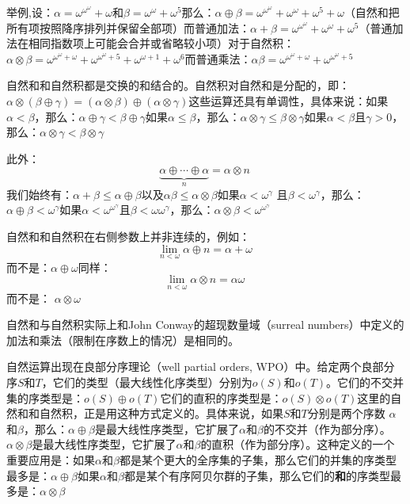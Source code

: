举例,设：\(\alpha = \omega^{\omega^{\omega}} + \omega\)和\(\beta = \omega^{\omega} + \omega^5\)那么：\(\alpha \oplus \beta = \omega^{\omega^{\omega}} + \omega^{\omega} + \omega^5 + \omega\)（自然和把所有项按照降序排列并保留全部项）而普通加法：\(\alpha + \beta = \omega^{\omega^{\omega}} + \omega^{\omega} + \omega^5\)（普通加法在相同指数项上可能会合并或省略较小项）对于自然积：\(\alpha \otimes \beta = \omega^{\omega^{\omega} + \omega} + \omega^{\omega^{\omega} + 5} + \omega^{\omega + 1} + \omega^6\)而普通乘法：\(\alpha\beta = \omega^{\omega^{\omega} + \omega} + \omega^{\omega^{\omega} + 5}\)

自然和和自然积都是交换的和结合的。自然积对自然和是分配的，即：\(\alpha\otimes (\beta \oplus \gamma) = (\alpha \otimes \beta)\oplus(\alpha\otimes \gamma)\)这些运算还具有单调性，具体来说：如果\(\alpha < \beta\)，那么：\(\alpha \oplus \gamma<\beta \oplus \gamma\)如果\(\alpha \leq\beta\)，那么：\(\alpha \otimes \gamma \leq \beta\otimes\gamma\)如果\(\alpha < \beta\)且\(\gamma > 0\)，那么：\(\alpha\otimes\gamma<\beta \otimes \gamma\)

此外：
\[
\underbrace{\alpha \oplus \cdots \oplus \alpha}_{n} = \alpha \otimes n~
\]
我们始终有：\(\alpha + \beta \leq \alpha \oplus \beta\)以及\(\alpha \beta \leq \alpha \otimes \beta\)如果\(\alpha<\omega^\gamma\) 且\(\beta<\omega^\gamma\)，那么：\(\alpha\oplus\beta<\omega^\gamma\)如果\(\alpha < \omega^{\omega^\gamma}\)且\(\beta<\omega{\omega^\gamma}\)，那么：\(\alpha \otimes \beta < \omega^{\omega^\gamma}\)

自然和和自然积在右侧参数上并非连续的，例如：\[\lim_{n < \omega} \alpha \oplus n = \alpha + \omega~\]而不是：\(\alpha \oplus \omega\)同样：\[\lim_{n < \omega}\alpha \otimes n = \alpha\omega~\]而不是：
\(\alpha \otimes \omega\)

自然和与自然积实际上和John Conway的超现数量域（surreal numbers）中定义的加法和乘法（限制在序数上的情况）是相同的。

自然运算出现在良部分序理论（well partial orders, WPO）中。给定两个良部分序\(S\)和\(T\)，它们的类型（最大线性化序类型）分别为\(o(S)\)和\(o(T)\)。它们的不交并集的序类型是：\(o(S)\oplus o(T)\)它们的直积的序类型是：\(o(S)\otimes o(T)\)这里的自然和和自然积，正是用这种方式定义的。具体来说，如果\(S\)和\(T\)分别是两个序数 \(\alpha\)和\(\beta\)，那么：\(\alpha \oplus\beta\)是最大线性序类型，它扩展了\(\alpha\)和\(\beta\)的不交并（作为部分序）。\(\alpha \otimes\beta\)是最大线性序类型，它扩展了\(\alpha\)和\(\beta\)的直积（作为部分序）。这种定义的一个重要应用是：如果\(\alpha\)和\(\beta\)都是某个更大的全序集的子集，那么它们的并集的序类型最多是：\(\alpha \oplus \beta\)如果\(\alpha\)和\(\beta\)都是某个有序阿贝尔群的子集，那么它们的\textbf{和}的序类型最多是：\(\alpha \otimes \beta\)

